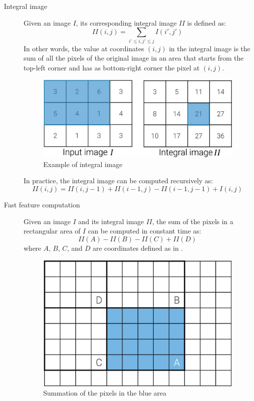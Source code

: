\begin{description}
    \item[Integral image] 
        Given an image $I$, its corresponding integral image $II$ is defined as:
        \[ II(i, j) = \sum_{i' \leq i, j' \leq j} I(i', j') \]
        In other words, the value at coordinates $(i, j)$ in the integral image is the sum of all the pixels of the original image in an area that starts from the top-left corner and has as bottom-right corner the pixel at $(i, j)$.
        \begin{figure}[H]
            \centering
            \includegraphics[width=0.45\linewidth]{./img/_integral_image.jpg}
            \caption{Example of integral image}
        \end{figure}

        \begin{remark}
            In practice, the integral image can be computed recursively as:
            \[ II(i, j) = II(i, j-1) + II(i-1, j) - II(i-1, j-1) + I(i, j) \]
        \end{remark}

    \item[Fast feature computation] 
        Given an image $I$ and its integral image $II$, the sum of the pixels in a rectangular area of $I$ can be computed in constant time as:
        \[ II(A) - II(B) - II(C) + II(D) \]
        where $A$, $B$, $C$, and $D$ are coordinates defined as in .
        \begin{figure}[H]
            \centering
            \includegraphics[width=0.5\linewidth]{./img/_integral_image_feature.jpg}
            \caption{Summation of the pixels in the blue area}
            \label{fig:integral_image_features}
        \end{figure}


\end{description}
